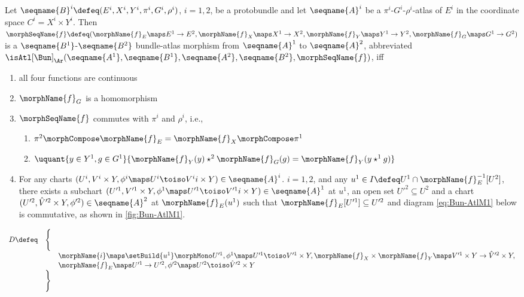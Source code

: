 \documentclass{article}
\begin{document}
\begin{definition}
\label{def:Bun-ATLmorph}
Let
$
  \seqname{B}^i
  \defeq
  (
    E^i,
    X^i,
    Y^i,
    \pi^i,
    G^i,
    \rho^i
  )
$,
$i=1,2$, be a protobundle and let $\seqname{A}^i$ be a
$\pi^i$-$G^i$-$\rho^i$-atlas of $E^i$ in the coordinate space
\nobreaks
  {{
    $C^i = X^i \times Y^i$.
  }}
Then
$
  \morphSeqName{f}
  \defeq
  (
    \morphName{f}_E \maps E^1 \to E^2,
    \morphName{f}_X \maps X^1 \to X^2,
    \morphName{f}_Y \maps Y^1 \to Y^2,
    \morphName{f}_G \maps G^1 \to G^2
  )
$
is a $\seqname{B^1}$-$\seqname{B^2}$ bundle-atlas morphism from
$\seqname{A}^1$ to $\seqname{A}^2$, abbreviated
\nobreaks
{{
  $
    \isAtl[\Bun]_\Ar
      (
        \seqname{A^1}, \seqname{B^1},
        \seqname{A^2}, \seqname{B^2},
        \morphSeqName{f}
      )
  $,
}}
iff
\begin{enumerate}
\item all four functions are continuous
\item $\morphName{f}_G$ is a homomorphism
\item $\morphSeqName{f}$ commutes with $\pi^i$ and $\rho^i$, i.e.,
\begin{enumerate}
\item $\pi^2 \morphCompose \morphName{f}_E = \morphName{f}_X \morphCompose \pi^1$
\item
$
  \uquant
    {{y \in Y^1},{g \in G^1}}
    {{
      \morphName{f}_Y(y) \star^2 \morphName{f}_G(g) =
      \morphName{f}_Y(y \star^1 g)
    }}
$
\end{enumerate}
\item For any charts
$(U^i, V^i \times Y, \phi^i \maps U^i \toiso V^ii \times Y) \in \seqname{A}^i$.
$i=1,2$, and any $u^1 \in I \defeq U^1 \cap \morphName{f}^{-1}_E[U^2]$,
there exists a subchart
$
  (U'^1, V'^1 \times Y, \phi^1 \maps U'^1 \toiso V'^1i \times Y)
  \in \seqname{A}^1
$
at $u^1$, an open set $U'^2 \subseteq U^2$ and a chart
$
  (U'^2 ,\hat{V}'^2 \times Y, \phi'^2) \in \seqname{A}^2
$
at $\morphName{f}_E(u^1)$ such that
$\morphName{f}_E[U'^1] \subseteq U'^2$ and diagram \eqref{eq:Bun-AtlM1}
below is commutative, as shown in \cref{fig:Bun-AtlM1}.
\end{enumerate}

\begin{equation}
\begin{array}{lll}
\label{eq:Bun-AtlM1}
D \defeq & \Biggl \{
\\
  &&
  \morphName{i} \maps \setBuild{u^1} \morphMono U'^1,
  \phi^1 \maps U'^1 \toiso V'^1 \times Y,
  \morphName{f}_X \times \morphName{f}_Y \maps V'^1 \times Y \to \hat{V}'^2 \times Y,
\\
  &&
  \morphName{f}_E \maps  U'^1 \to U'^2,
  \phi'^2 \maps U'^2 \toiso \hat{V}'^2 \times Y
\\
& \Biggr \}
\end{array}
\end{equation}


\end{definition}
\end{document}
